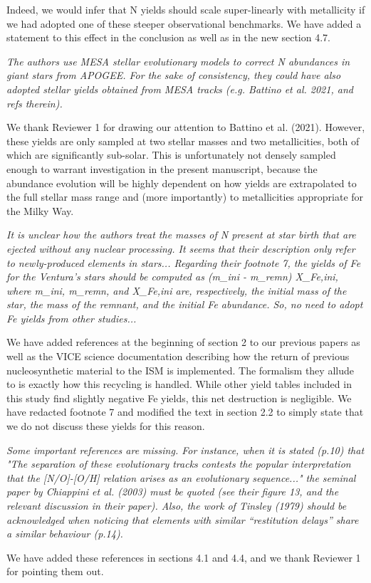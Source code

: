 \documentclass[12pt]{article}
\newcommand\doublebreak[0]{\par\null\par\noindent}
\begin{document}
\doublebreak
Indeed, we would infer that N yields should scale super-linearly with
metallicity if we had adopted one of these steeper observational benchmarks.
We have added a statement to this effect in the conclusion as well as in the
new section 4.7.
\doublebreak
\textit{%
The authors use MESA stellar evolutionary models to correct N abundances in
giant stars from APOGEE. For the sake of consistency, they could have also
adopted stellar yields obtained from MESA tracks (e.g. Battino et al. 2021, and
refs therein).
}
\doublebreak
We thank Reviewer 1 for drawing our attention to Battino et al. (2021).
However, these yields are only sampled at two stellar masses and two
metallicities, both of which are significantly sub-solar.
This is unfortunately not densely sampled enough to warrant investigation in
the present manuscript, because the abundance evolution will be highly
dependent on how yields are extrapolated to the full stellar mass range and
(more importantly) to metallicities appropriate for the Milky Way.
\doublebreak
\textit{%
It is unclear how the authors treat the masses of N present at star birth that
are ejected without any nuclear processing. It seems that their description only
refer to newly-produced elements in stars... Regarding their footnote 7, the
yields of Fe for the Ventura's stars should be computed as (m\_ini - m\_remn)
X\_Fe,ini, where m\_ini, m\_remn, and X\_Fe,ini are, respectively, the initial
mass of the star, the mass of the remnant, and the initial Fe abundance. So, no
need to adopt Fe yields from other studies...
}
\doublebreak
We have added references at the beginning of section 2 to our previous papers
as well as the VICE science documentation describing how the return of previous
nucleosynthetic material to the ISM is implemented.
The formalism they allude to is exactly how this recycling is handled.
While other yield tables included in this study find slightly negative Fe
yields, this net destruction is negligible.
We have redacted footnote 7 and modified the text in section 2.2 to simply
state that we do not discuss these yields for this reason.
\doublebreak
\textit{%
Some important references are missing. For instance, when it is stated (p.10)
that "The separation of these evolutionary tracks contests the popular
interpretation that the [N/O]-[O/H] relation arises as an evolutionary
sequence..." the seminal paper by Chiappini et al. (2003) must be quoted (see
their figure 13, and the relevant discussion in their paper). Also, the work of
Tinsley (1979) should be acknowledged when noticing that elements with similar
``restitution delays'' share a similar behaviour (p.14).
}
\doublebreak
We have added these references in sections 4.1 and 4.4, and we thank Reviewer 1
for pointing them out.
\end{document}

